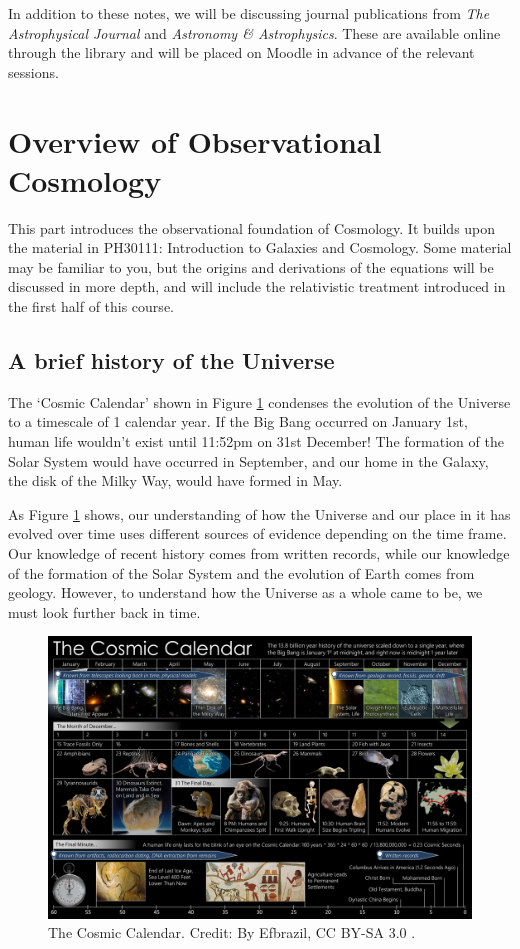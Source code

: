 \documentclass[11pt,a4paper,notoc]{tufte-handout}
\begin{document}
In addition to these notes, we will be discussing journal publications
from \emph{The Astrophysical Journal} and \emph{Astronomy \& Astrophysics}. These
are available online through the library and will be placed on Moodle
in advance of the relevant sessions.

\hypertarget{ch:intro_obs}{%
\section{Overview of Observational Cosmology}\label{ch:intro_obs}}

This part introduces the observational foundation of Cosmology. It
builds upon the material in PH30111: Introduction to Galaxies and
Cosmology. Some material may be familiar to you, but the origins and
derivations of the equations will be discussed in more depth, and will
include the relativistic treatment introduced in the first half of this
course.

\hypertarget{sec:history}{%
\subsection{A brief history of the Universe}\label{sec:history}}

The `Cosmic Calendar' shown in
Figure \ref{fig:cosmic-calendar} condenses the evolution of the Universe
to a timescale of 1 calendar year. If the Big Bang occurred on January
1st, human life wouldn't exist until 11:52pm on 31st December! The
formation of the Solar System would have occurred in September, and our
home in the Galaxy, the disk of the Milky Way, would have formed in May.

As
Figure \ref{fig:cosmic-calendar} shows, our understanding of how the
Universe and our place in it has evolved over time uses different
sources of evidence depending on the time frame. Our knowledge of recent
history comes from written records, while our knowledge of the formation
of the Solar System and the evolution of Earth comes from geology.
However, to understand how the Universe as a whole came to be, we must
look further back in time.

\begin{figure}
\includegraphics[width=1\linewidth]{Images/CosmicCalendar} \caption{The Cosmic Calendar. Credit: By Efbrazil, CC BY-SA 3.0 \citep{wikipedia_2020}.}\label{fig:cosmic-calendar}
\end{figure}
\end{document}
